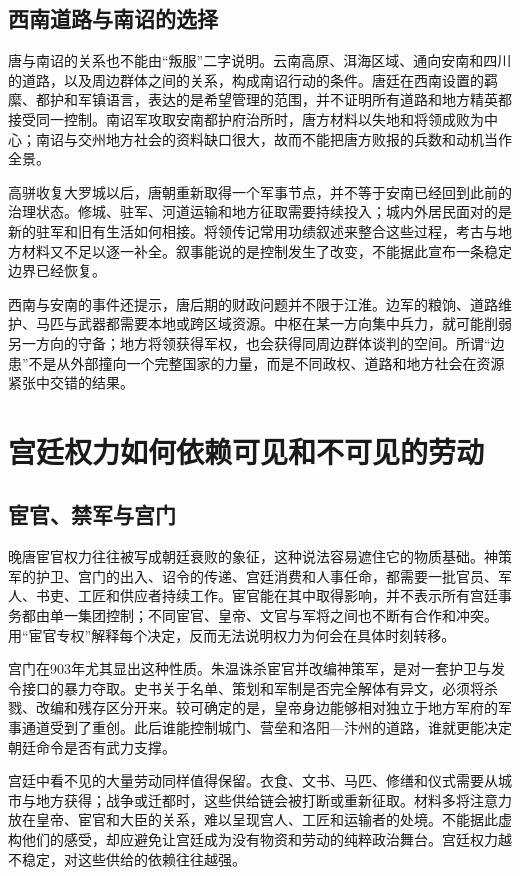 \subsection{西南道路与南诏的选择}
唐与南诏的关系也不能由“叛服”二字说明。云南高原、洱海区域、通向安南和四川的道路，以及周边群体之间的关系，构成南诏行动的条件。唐廷在西南设置的羁縻、都护和军镇语言，表达的是希望管理的范围，并不证明所有道路和地方精英都接受同一控制。南诏军攻取安南都护府治所时，唐方材料以失地和将领成败为中心；南诏与交州地方社会的资料缺口很大，故而不能把唐方败报的兵数和动机当作全景。

高骈收复大罗城以后，唐朝重新取得一个军事节点，并不等于安南已经回到此前的治理状态。修城、驻军、河道运输和地方征取需要持续投入；城内外居民面对的是新的驻军和旧有生活如何相接。将领传记常用功绩叙述来整合这些过程，考古与地方材料又不足以逐一补全。叙事能说的是控制发生了改变，不能据此宣布一条稳定边界已经恢复。

西南与安南的事件还提示，唐后期的财政问题并不限于江淮。边军的粮饷、道路维护、马匹与武器都需要本地或跨区域资源。中枢在某一方向集中兵力，就可能削弱另一方向的守备；地方将领获得军权，也会获得同周边群体谈判的空间。所谓“边患”不是从外部撞向一个完整国家的力量，而是不同政权、道路和地方社会在资源紧张中交错的结果。

\section{宫廷权力如何依赖可见和不可见的劳动}

\subsection{宦官、禁军与宫门}
晚唐宦官权力往往被写成朝廷衰败的象征，这种说法容易遮住它的物质基础。神策军的护卫、宫门的出入、诏令的传递、宫廷消费和人事任命，都需要一批官员、军人、书吏、工匠和供应者持续工作。宦官能在其中取得影响，并不表示所有宫廷事务都由单一集团控制；不同宦官、皇帝、文官与军将之间也不断有合作和冲突。用“宦官专权”解释每个决定，反而无法说明权力为何会在具体时刻转移。

宫门在903年尤其显出这种性质。朱温诛杀宦官并改编神策军，是对一套护卫与发令接口的暴力夺取。史书关于名单、策划和军制是否完全解体有异文，必须将杀戮、改编和残存区分开来。较可确定的是，皇帝身边能够相对独立于地方军府的军事通道受到了重创。此后谁能控制城门、营垒和洛阳—汴州的道路，谁就更能决定朝廷命令是否有武力支撑。

宫廷中看不见的大量劳动同样值得保留。衣食、文书、马匹、修缮和仪式需要从城市与地方获得；战争或迁都时，这些供给链会被打断或重新征取。材料多将注意力放在皇帝、宦官和大臣的关系，难以呈现宫人、工匠和运输者的处境。不能据此虚构他们的感受，却应避免让宫廷成为没有物资和劳动的纯粹政治舞台。宫廷权力越不稳定，对这些供给的依赖往往越强。

